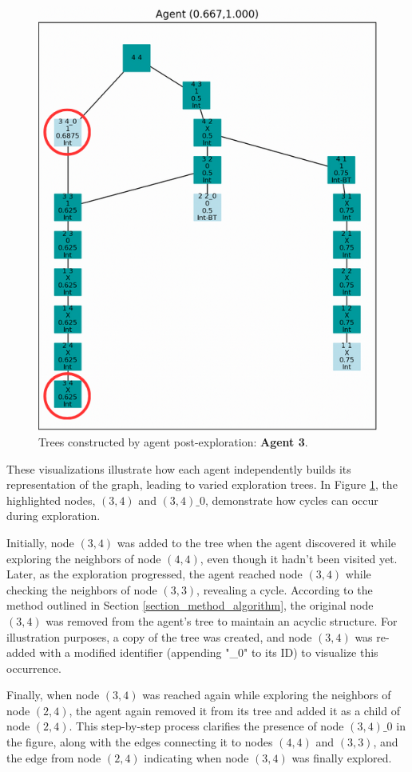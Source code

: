 \begin{figure}[H]
\centering
\includegraphics[width=1\textwidth]{Cap2/agent_3.png}
\caption{Trees constructed by agent post-exploration: \textbf{Agent 3}.}
\label{fig_agent_3_tree}
\end{figure}
    

These visualizations illustrate how each agent independently builds its representation of the graph, leading to varied exploration trees. In Figure \ref{fig_agent_3_tree}, the highlighted nodes, $(3, 4)$ and $(3, 4)\_0$, demonstrate how cycles can occur during exploration.

Initially, node $(3, 4)$ was added to the tree when the agent discovered it while exploring the neighbors of node $(4, 4)$, even though it hadn't been visited yet. Later, as the exploration progressed, the agent reached node $(3, 4)$ while checking the neighbors of node $(3, 3)$, revealing a cycle. According to the method outlined in Section \ref{section_method_algorithm}, the original node $(3, 4)$ was removed from the agent's tree to maintain an acyclic structure. For illustration purposes, a copy of the tree was created, and node $(3, 4)$ was re-added with a modified identifier (appending "\_0" to its ID) to visualize this occurrence.

Finally, when node $(3, 4)$ was reached again while exploring the neighbors of node $(2, 4)$, the agent again removed it from its tree and added it as a child of node $(2, 4)$. This step-by-step process clarifies the presence of node $(3, 4)\_0$ in the figure, along with the edges connecting it to nodes $(4, 4)$ and $(3, 3)$, and the edge from node $(2, 4)$ indicating when node $(3, 4)$ was finally explored.